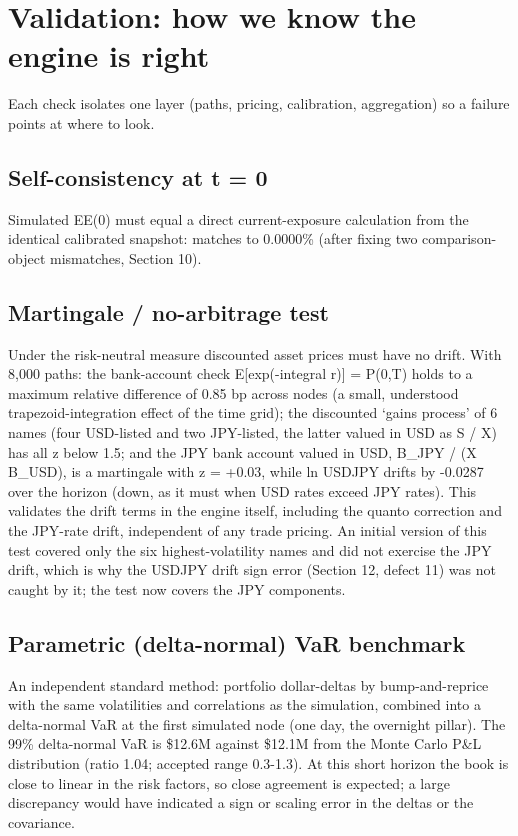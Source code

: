 \documentclass[11pt,letterpaper]{article}
\begin{document}
\section{Validation: how we know the engine is right}
Each check isolates one layer (paths, pricing, calibration, aggregation) so a failure points at where to look.

\subsection{Self-consistency at t = 0}
Simulated EE(0) must equal a direct current-exposure calculation from the identical calibrated snapshot: matches to 0.0000\% (after fixing two comparison-object mismatches, Section 10).

\subsection{Martingale / no-arbitrage test}
Under the risk-neutral measure discounted asset prices must have no drift. With 8,000 paths: the bank-account check E[exp(-integral r)] = P(0,T) holds to a maximum relative difference of 0.85 bp across nodes (a small, understood trapezoid-integration effect of the time grid); the discounted `gains process' of 6 names (four USD-listed and two JPY-listed, the latter valued in USD as S / X) has all \textbar{}z\textbar{} below 1.5; and the JPY bank account valued in USD, B\_JPY / (X B\_USD), is a martingale with z = +0.03, while ln USDJPY drifts by -0.0287 over the horizon (down, as it must when USD rates exceed JPY rates). This validates the drift terms in the engine itself, including the quanto correction and the JPY-rate drift, independent of any trade pricing. An initial version of this test covered only the six highest-volatility names and did not exercise the JPY drift, which is why the USDJPY drift sign error (Section 12, defect 11) was not caught by it; the test now covers the JPY components.

\subsection{Parametric (delta-normal) VaR benchmark}
An independent standard method: portfolio dollar-deltas by bump-and-reprice with the same volatilities and correlations as the simulation, combined into a delta-normal VaR at the first simulated node (one day, the overnight pillar). The 99\% delta-normal VaR is \$12.6M against \$12.1M from the Monte Carlo P\&L distribution (ratio 1.04; accepted range 0.3-1.3). At this short horizon the book is close to linear in the risk factors, so close agreement is expected; a large discrepancy would have indicated a sign or scaling error in the deltas or the covariance.
\end{document}
